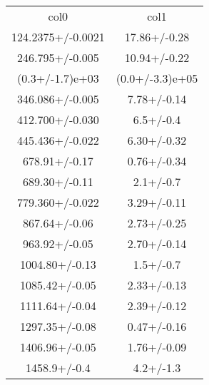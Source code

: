 \begin{table}
\begin{tabular}{cc}
col0 & col1 \\
124.2375+/-0.0021 & 17.86+/-0.28 \\
246.795+/-0.005 & 10.94+/-0.22 \\
(0.3+/-1.7)e+03 & (0.0+/-3.3)e+05 \\
346.086+/-0.005 & 7.78+/-0.14 \\
412.700+/-0.030 & 6.5+/-0.4 \\
445.436+/-0.022 & 6.30+/-0.32 \\
678.91+/-0.17 & 0.76+/-0.34 \\
689.30+/-0.11 & 2.1+/-0.7 \\
779.360+/-0.022 & 3.29+/-0.11 \\
867.64+/-0.06 & 2.73+/-0.25 \\
963.92+/-0.05 & 2.70+/-0.14 \\
1004.80+/-0.13 & 1.5+/-0.7 \\
1085.42+/-0.05 & 2.33+/-0.13 \\
1111.64+/-0.04 & 2.39+/-0.12 \\
1297.35+/-0.08 & 0.47+/-0.16 \\
1406.96+/-0.05 & 1.76+/-0.09 \\
1458.9+/-0.4 & 4.2+/-1.3 \\
\end{tabular}
\end{table}
